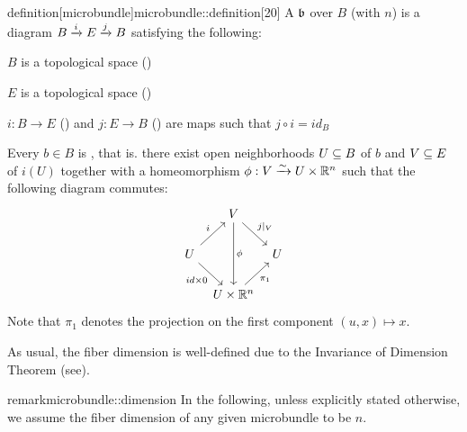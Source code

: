 \begin{mystatement}{definition}[microbundle]{microbundle::definition}[20]
    A  $\bb$ over $B$ (with  $n$)
    is a diagram $\bundle{B}{E}{i}{j}$ satisfying the following:
    \begin{properties}
        \item $B$ is a topological space ()
        \item $E$ is a topological space ()
        \item $i: B \to E$ () and $j: E \to B$ ()
        are maps such that $j \circ i = id_B$
        \item Every $b \in B$ is ,
        that is. there exist open neighborhoods $U \sub B$ of $b$ and $V \sub E$ of $i(U)$
        together with a homeomorphism $\phi: V \isomto U \cross \R^n$ such that the following diagram commutes:
        \[
            \begin{tikzcd}[column sep=tiny]
                & V \ar[dr, "j\vert_V"] \ar[dd, "\phi"] & \\
                U \ar[ur, "i"] \ar[dr, "{id \cross 0}"'] & & U \\
                & U \cross\R^n \ar[ur, "\pi_1"'] &
            \end{tikzcd}
        \]
        Note that $\pi_1$ denotes the projection on the first component $(u, x) \mapsto x$.
    \end{properties}
\end{mystatement}

As usual, the fiber dimension is well-defined due to the Invariance of Dimension Theorem (see\cite[cor.19.10]{brendon}).
\begin{mystatement}{remark}{microbundle::dimension}
    In the following, unless explicitly stated otherwise,
    we assume the fiber dimension of any given microbundle to be $n$.
\end{mystatement}